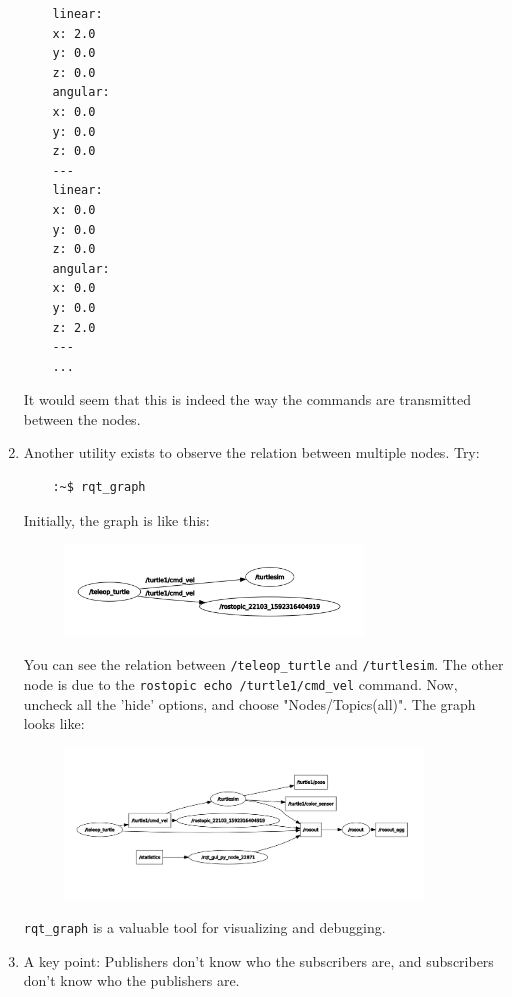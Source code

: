 \documentclass{article}
\begin{document}
\begin{enumerate}
\begin{verbatim}
    linear: 
    x: 2.0
    y: 0.0
    z: 0.0
    angular: 
    x: 0.0
    y: 0.0
    z: 0.0
    ---
    linear: 
    x: 0.0
    y: 0.0
    z: 0.0
    angular: 
    x: 0.0
    y: 0.0
    z: 2.0
    ---
    ...
        \end{verbatim}
        It would seem that this is indeed the way the commands are transmitted between the nodes.
        
        \item Another utility exists to observe the relation between multiple nodes. Try:
        \begin{verbatim}
    :~$ rqt_graph
        \end{verbatim}
        Initially, the graph is like this:
        \begin{figure}[H]
            \center
            \includegraphics[width = 0.75\textwidth]{graph1.png}
        \end{figure}
        You can see the relation between \texttt{/teleop\_turtle} and \texttt{/turtlesim}.
        The other node is due to the \texttt{rostopic echo /turtle1/cmd\_vel} command.
        Now, uncheck all the 'hide' options, and choose "Nodes/Topics(all)". The graph looks like:
        \begin{figure}[H]
            \center
            \includegraphics[width = 0.9\textwidth]{graph2.png}
        \end{figure}
        \texttt{rqt\_graph} is a valuable tool for visualizing and debugging.
        
        \item A key point: Publishers don't know who the subscribers are, and subscribers don't know who the 
        publishers are.


\end{enumerate}
\end{document}
